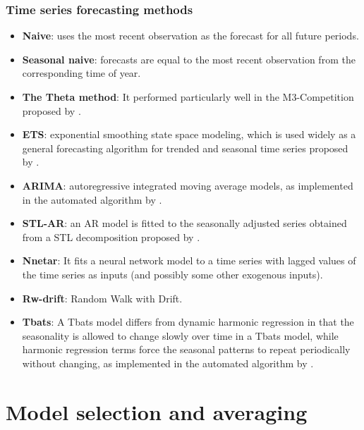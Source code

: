 \documentclass[10pt,aspectratio=43]{beamer}
\begin{document}
\begin{frame}
  \frametitle{Time series forecasting methods}

  \begin{itemize}
\item \textbf{Naive}: uses the most recent observation as the forecast for all future periods.

\item \textbf{Seasonal naive}: forecasts are equal to the most recent observation from the
  corresponding time of year.

\item \textbf{The Theta method}: It performed particularly well in the M3-Competition proposed by
  \citet{Assimakopoulos2000The}.

\item \textbf{ETS}: exponential smoothing state space modeling, which is used widely as a general
  forecasting algorithm for trended and seasonal time series proposed by
  \citet{Hyndman2017A}.

\item \textbf{ARIMA}: autoregressive integrated moving average models, as implemented in the
  automated algorithm by \citet{HK08}.

\item \textbf{STL-AR}: an AR model is fitted to the seasonally adjusted series obtained from a STL
  decomposition proposed by \citet{cleveland1990stl}.

\item \textbf{Nnetar}: It fits a neural network model to a time series with lagged values of the
  time series as inputs (and possibly some other exogenous inputs).

\item \textbf{Rw-drift}: Random Walk with Drift.

\item \textbf{Tbats}: A Tbats model differs from dynamic harmonic regression in that the
  seasonality is allowed to change slowly over time in a Tbats model, while harmonic
  regression terms force the seasonal patterns to repeat periodically without changing, as
  implemented in the automated algorithm by \citet{HK08}.
\end{itemize}
\end{frame}

\section{Model selection and averaging}
\end{document}
